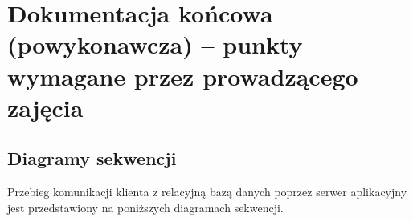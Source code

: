 \documentclass[10pt,a4paper]{article}
\begin{document}
\newpage
\section{Dokumentacja końcowa (powykonawcza) -- punkty wymagane przez prowadzącego zajęcia}

\subsection{Diagramy sekwencji}
Przebieg komunikacji klienta z relacyjną bazą danych poprzez serwer aplikacyjny jest przedstawiony na poniższych diagramach sekwencji.
\end{document}
